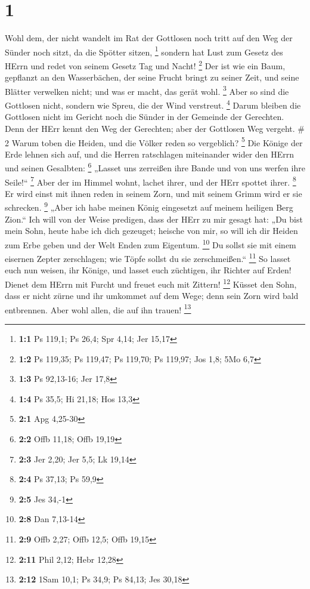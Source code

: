 \hypertarget{section}{%
\section{1}\label{section}}

 Wohl dem, der nicht wandelt im Rat der Gottlosen noch tritt
auf den Weg der Sünder noch sitzt, da die Spötter sitzen, \footnote{\textbf{1:1}
  Ps 119,1; Ps 26,4; Spr 4,14; Jer 15,17}  sondern hat Lust
zum Gesetz des HErrn und redet von seinem Gesetz Tag und Nacht!
\footnote{\textbf{1:2} Ps 119,35; Ps 119,47; Ps 119,70; Ps 119,97; Jos
  1,8; 5Mo 6,7}  Der ist wie ein Baum, gepflanzt an den
Wasserbächen, der seine Frucht bringt zu seiner Zeit, und seine Blätter
verwelken nicht; und was er macht, das gerät wohl. \footnote{\textbf{1:3}
  Ps 92,13-16; Jer 17,8}  Aber so sind die Gottlosen nicht,
sondern wie Spreu, die der Wind verstreut. \footnote{\textbf{1:4} Ps
  35,5; Hi 21,18; Hos 13,3}  Darum bleiben die Gottlosen
nicht im Gericht noch die Sünder in der Gemeinde der Gerechten.
 Denn der HErr kennt den Weg der Gerechten; aber der
Gottlosen Weg vergeht. \# 2  Warum toben die Heiden, und die
Völker reden so vergeblich? \footnote{\textbf{2:1} Apg 4,25-30}
 Die Könige der Erde lehnen sich auf, und die Herren
ratschlagen miteinander wider den HErrn und seinen Gesalbten:
\footnote{\textbf{2:2} Offb 11,18; Offb 19,19}  „Lasset uns
zerreißen ihre Bande und von uns werfen ihre Seile!{}`` \footnote{\textbf{2:3}
  Jer 2,20; Jer 5,5; Lk 19,14}  Aber der im Himmel wohnt,
lachet ihrer, und der HErr spottet ihrer. \footnote{\textbf{2:4} Ps
  37,13; Ps 59,9}  Er wird einst mit ihnen reden in seinem
Zorn, und mit seinem Grimm wird er sie schrecken. \footnote{\textbf{2:5}
  Jes 34,-1}  „Aber ich habe meinen König eingesetzt auf
meinem heiligen Berg Zion.``  Ich will von der Weise
predigen, dass der HErr zu mir gesagt hat: „Du bist mein Sohn, heute
habe ich dich gezeuget;  heische von mir, so will ich dir
Heiden zum Erbe geben und der Welt Enden zum Eigentum. \footnote{\textbf{2:8}
  Dan 7,13-14}  Du sollst sie mit einem eisernen Zepter
zerschlagen; wie Töpfe sollst du sie zerschmeißen.`` \footnote{\textbf{2:9}
  Offb 2,27; Offb 12,5; Offb 19,15}  So lasset euch nun
weisen, ihr Könige, und lasset euch züchtigen, ihr Richter auf Erden!
 Dienet dem HErrn mit Furcht und freuet euch mit Zittern!
\footnote{\textbf{2:11} Phil 2,12; Hebr 12,28}  Küsset den
Sohn, dass er nicht zürne und ihr umkommet auf dem Wege; denn sein Zorn
wird bald entbrennen. Aber wohl allen, die auf ihn trauen! \footnote{\textbf{2:12}
  1Sam 10,1; Ps 34,9; Ps 84,13; Jes 30,18}

